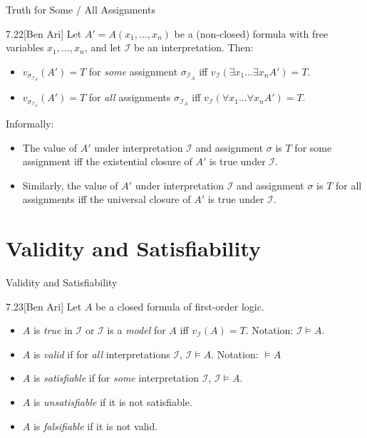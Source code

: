\documentclass[style=sailor,size=12pt]{powerdot}
\begin{document}
\begin{wideslide}[bm=,toc=]{Truth for Some / All Assignments}
\begin{thm}{7.22}[Ben Ari]
Let $A' = A(x_1,...,x_n)$ be a (non-closed) formula with free variables
$x_1,...,x_n$, and let $\mathcal{I}$ be an interpretation. Then:
\end{thm}
\vspace*{-2ex}
\begin{itemize}
\item $v_{\sigma_{\mathcal{I}_A}}(A') = T$ for \emph{some} assignment $\sigma_{\mathcal{I}_A}$ iff $v_{\mathcal{I}}(\exists x_1 ... \exists x_n A') = T$.
\item $v_{\sigma_{\mathcal{I}_A}}(A') = T$ for \emph{all} assignments
$\sigma_{\mathcal{I}_A}$ iff $v_{\mathcal{I}}(\forall x_1 ... \forall x_n A') = T$.
\end{itemize}
Informally:
\begin{itemize}
\item The value of $A'$ under interpretation $\mathcal{I}$ and assignment
$\sigma$ is $T$ for some assignment iff the existential closure of $A'$ is true 
under $\mathcal{I}$. 
\item Similarly, the value of $A'$ under interpretation $\mathcal{I}$ and assignment
$\sigma$ is $T$ for all assignments iff the universal closure of $A'$ is true 
under $\mathcal{I}$. 
\end{itemize}
\end{wideslide}

\section[slide=true]{Validity and Satisfiability}

\begin{wideslide}[bm=,toc=]{Validity and Satisfiability}
\begin{defn}{7.23}[Ben Ari]
Let $A$ be a closed formula of first-order logic.
\end{defn}
\vspace{-2ex}
\begin{itemize}
\item $A$ is \emph{true} in $\mathcal{I}$ or $\mathcal{I}$ is a \emph{model} for
$A$ iff $v_{\mathcal{I}}(A) = T$. Notation: $\mathcal{I} \models A$.
\item $A$ is \emph{valid} if for \emph{all} interpretations $\mathcal{I}$,
$\mathcal{I} \models A$. Notation: $\models A$ 
\item $A$ is \emph{satisfiable} if for \emph{some} interpretation $\mathcal{I}$,
$\mathcal{I} \models A$.
\item $A$ is \emph{unsatisfiable} if it is not satisfiable. 
\item $A$ is \emph{falsifiable} if it is not valid. 
\end{itemize}

\end{wideslide}
\end{document}
